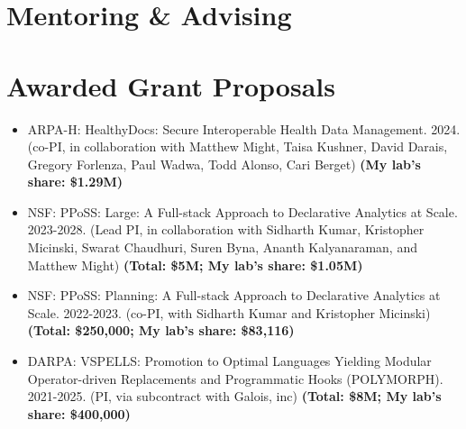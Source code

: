 \documentclass[line]{res}
\begin{document}
\begin{resume}
\section{\large Mentoring \& Advising}



\section{\large Awarded Grant Proposals} \vspace{0.45cm}

\begin{itemize}
  \item
  ARPA-H: HealthyDocs: Secure Interoperable Health Data Management. 2024. (co-PI, in collaboration with Matthew Might, Taisa Kushner, David Darais, Gregory Forlenza, Paul Wadwa, Todd Alonso, Cari Berget) \textbf{(My lab's share: \$1.29M)} 
  \item
  NSF: PPoSS: Large: A Full-stack Approach to Declarative Analytics at Scale. 2023-2028. (Lead PI, in collaboration with Sidharth Kumar, Kristopher Micinski, Swarat Chaudhuri, Suren Byna, Ananth Kalyanaraman, and Matthew Might) \textbf{(Total: \$5M; My lab's share: \$1.05M)} 
  \item
  NSF: PPoSS: Planning: A Full-stack Approach to Declarative Analytics at Scale. 2022-2023. (co-PI, with Sidharth Kumar and Kristopher Micinski) \textbf{(Total: \$250,000; My lab's share: \$83,116)} 
  \item
  DARPA: VSPELLS: Promotion to Optimal Languages Yielding Modular Operator-driven Replacements and Programmatic Hooks (POLYMORPH). 2021-2025. (PI, via subcontract with Galois, inc) \textbf{(Total: \$8M; My lab's share: \$400,000)}
\end{itemize}





\end{resume}
\end{document}
